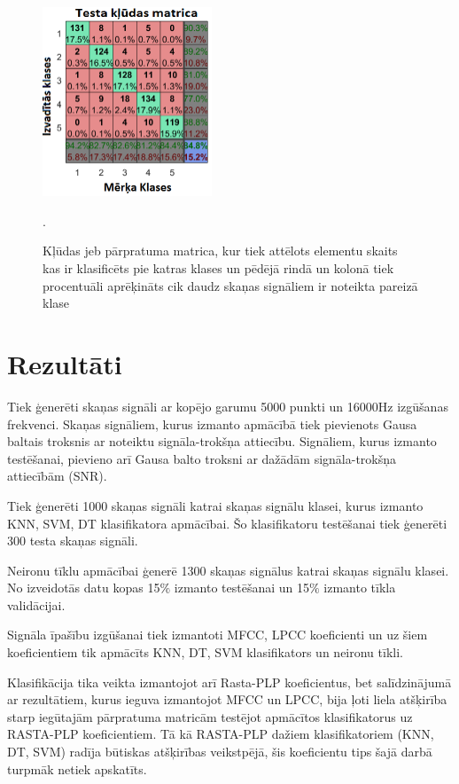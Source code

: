 \documentclass[12pt,paper=A4]{report}
\begin{document}
\begin{figure}[H] \centering
\includegraphics[width=0.45\textwidth]{confussion1} 
\caption{Kļūdas jeb pārpratuma matrica, kur tiek attēlots elementu skaits kas ir klasificēts pie katras klases un pēdējā rindā un kolonā tiek procentuāli aprēķināts cik daudz skaņas signāliem ir noteikta pareizā klase \cite{dtw40}} .  \label{confussion} 
\end{figure}


\section{Rezultāti}

Tiek ģenerēti skaņas signāli ar kopējo garumu 5000 punkti un 16000Hz izgūšanas frekvenci. 
Skaņas signāliem, kurus izmanto apmācībā tiek pievienots Gausa baltais troksnis
ar noteiktu signāla-trokšņa attiecību. Signāliem, kurus izmanto testēšanai, pievieno arī
Gausa balto troksni ar dažādām signāla-trokšņa attiecībām (SNR). 

Tiek ģenerēti 1000 skaņas signāli katrai skaņas signālu klasei, kurus izmanto KNN, SVM, DT klasifikatora apmācībai. Šo klasifikatoru testēšanai tiek ģenerēti 300 testa skaņas signāli. 

Neironu tīklu apmācībai ģenerē 1300 skaņas signālus katrai skaņas signālu klasei. No izveidotās datu kopas 15$\%$ izmanto testēšanai un 15$\%$ izmanto tīkla validācijai.

Signāla īpašību izgūšanai tiek izmantoti MFCC, LPCC koeficienti un uz šiem koeficientiem tik apmācīts KNN, DT, SVM klasifikators
un neironu tīkli. 

Klasifikācija tika veikta izmantojot arī Rasta-PLP koeficientus, bet salīdzinājumā ar rezultātiem, kurus ieguva izmantojot MFCC un LPCC, bija ļoti liela atšķirība starp iegūtajām pārpratuma matricām testējot apmācītos klasifikatorus uz RASTA-PLP koeficientiem. Tā kā RASTA-PLP dažiem klasifikatoriem (KNN, DT, SVM) radīja būtiskas atšķirības veikstpējā, šis koeficientu tips šajā darbā turpmāk netiek apskatīts. 
\end{document}

